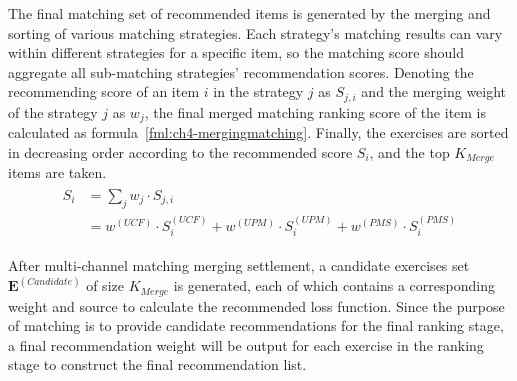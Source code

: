 The final matching set of recommended items is generated by the merging and sorting of various matching strategies. Each strategy's matching results can vary within different strategies for a specific item, so the matching score should aggregate all sub-matching strategies' recommendation scores.  Denoting the recommending score of an item \(i\) in the strategy \(j\) as \(S_{j, i}\) and the merging weight of the strategy \(j\) as \(w_j\), the final merged matching ranking score of the item is calculated as formula~\ref{fml:ch4-mergingmatching}. Finally, the exercises are sorted in decreasing order according to the recommended score \(S_i\), and the top \(K_{Merge}\) items are taken.
\begin{align}\label{fml:ch4-mergingmatching}
    \begin{split}
        S_i & = \sum_{j}{w_j\cdot S_{j,i}}                                                       \\
        & = w^{(UCF)}\cdot S^{(UCF)}_i+w^{(UPM)}\cdot S^{(UPM)}_i+w^{(PMS)}\cdot S^{(PMS)}_i
    \end{split}
\end{align}



After multi-channel matching merging settlement, a candidate exercises set \(\mathbf{E}^{(Candidate)}\) of size \(K_{Merge}\) is generated, each of which contains a corresponding weight and source to calculate the recommended loss function. Since the purpose of matching is to provide candidate recommendations for the final ranking stage, a final recommendation weight will be output for each exercise in the ranking stage to construct the final recommendation list.

